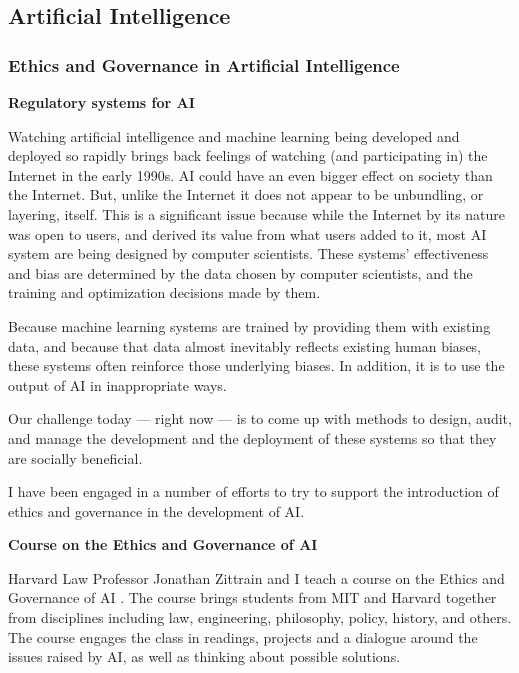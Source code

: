 \subsection{Artificial Intelligence}

\subsubsection{Ethics and Governance in Artificial Intelligence}
\label{sec:EGAI}

\textbf{Regulatory systems for \ac{AI}}

Watching artificial intelligence and machine learning being developed and deployed so rapidly brings back feelings of watching (and participating in) the Internet in the early 1990s. AI could have an even bigger effect on society than the Internet. But, unlike the Internet it does not appear to be unbundling, or layering, itself. This is a significant issue because while the Internet by its nature was open to users, and derived its value from what users added to it, most AI system are being designed by computer scientists. These systems' effectiveness and bias are determined by the data chosen by computer scientists, and the training and optimization decisions made by them.

Because machine learning systems are trained by providing them with existing data, and because that data almost inevitably reflects existing human biases,  these systems often reinforce those underlying biases. In addition, it is to use the output of AI in inappropriate ways.

Our challenge today --- right now --- is to come up with methods to design, audit, and manage the development and the deployment of these systems so that they are socially beneficial.

I have been engaged in a number of efforts to try to support the introduction of ethics and governance in the development of \ac{AI}.

\textbf{Course on the Ethics and Governance of \ac{AI}}

Harvard Law Professor Jonathan Zittrain and I teach a course on the Ethics and Governance of \ac{AI} \cite{TheEthic48:online}. The course brings students from MIT and Harvard together from disciplines including law, engineering, philosophy, policy, history, and others. The course engages the class in readings, projects and a dialogue around the issues raised by \ac{AI}, as well as thinking about possible solutions.

